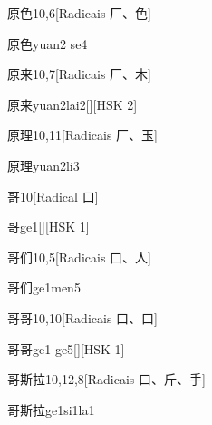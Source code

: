 \begin{entry}{原色}{10,6}[Radicais ⼚、⾊]
  \begin{phonetics}{原色}{yuan2 se4}
  \end{phonetics}
\end{entry}

\begin{entry}{原来}{10,7}[Radicais ⼚、⽊]
  \begin{phonetics}{原来}{yuan2lai2}[][HSK 2]
  \end{phonetics}
\end{entry}

\begin{entry}{原理}{10,11}[Radicais ⼚、⽟]
  \begin{phonetics}{原理}{yuan2li3}
  \end{phonetics}
\end{entry}

\begin{entry}{哥}{10}[Radical ⼝]
  \begin{phonetics}{哥}{ge1}[][HSK 1]
  \end{phonetics}
\end{entry}

\begin{entry}{哥们}{10,5}[Radicais ⼝、⼈]
  \begin{phonetics}{哥们}{ge1men5}
  \end{phonetics}
\end{entry}

\begin{entry}{哥哥}{10,10}[Radicais ⼝、⼝]
  \begin{phonetics}{哥哥}{ge1 ge5}[][HSK 1]
  \end{phonetics}
\end{entry}

\begin{entry}{哥斯拉}{10,12,8}[Radicais ⼝、⽄、⼿]
  \begin{phonetics}{哥斯拉}{ge1si1la1}
  \end{phonetics}
\end{entry}

